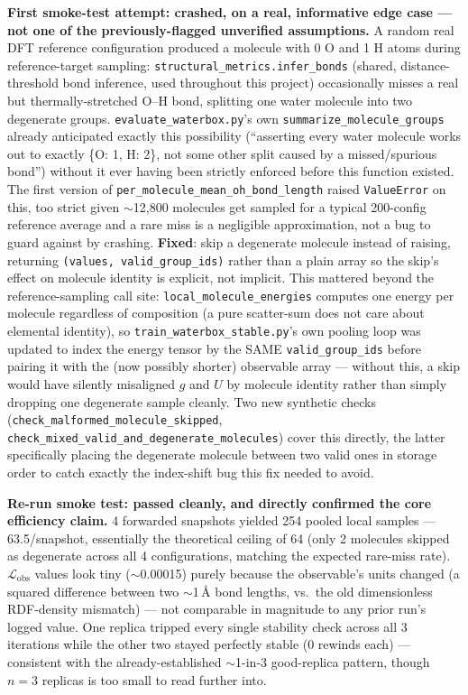 \documentclass[11pt]{article}
\begin{document}
\textbf{First smoke-test attempt: crashed, on a real, informative edge case
--- not one of the previously-flagged unverified assumptions.} A random
real DFT reference configuration produced a molecule with 0 O and 1 H atoms
during reference-target sampling: \texttt{structural\_metrics.infer\_bonds}
(shared, distance-threshold bond inference, used throughout this project)
occasionally misses a real but thermally-stretched O--H bond, splitting one
water molecule into two degenerate groups.
\texttt{evaluate\_waterbox.py}'s own \texttt{summarize\_molecule\_groups}
already anticipated exactly this possibility (``asserting every water
molecule works out to exactly \{O: 1, H: 2\}, not some other split caused
by a missed/spurious bond'') without it ever having been strictly enforced
before this function existed. The first version of
\texttt{per\_molecule\_mean\_oh\_bond\_length} raised \texttt{ValueError}
on this, too strict given $\sim$12{,}800 molecules get sampled for a
typical 200-config reference average and a rare miss is a negligible
approximation, not a bug to guard against by crashing. \textbf{Fixed}: skip
a degenerate molecule instead of raising, returning
\texttt{(values, valid\_group\_ids)} rather than a plain array so the
skip's effect on molecule identity is explicit, not implicit. This
mattered beyond the reference-sampling call site:
\texttt{local\_molecule\_energies} computes one energy per molecule
regardless of composition (a pure scatter-sum does not care about
elemental identity), so \texttt{train\_waterbox\_stable.py}'s own pooling
loop was updated to index the energy tensor by the SAME
\texttt{valid\_group\_ids} before pairing it with the (now possibly
shorter) observable array --- without this, a skip would have silently
misaligned $g$ and $U$ by molecule identity rather than simply dropping one
degenerate sample cleanly. Two new synthetic checks
(\texttt{check\_malformed\_molecule\_skipped},
\texttt{check\_mixed\_valid\_and\_degenerate\_molecules}) cover this
directly, the latter specifically placing the degenerate molecule between
two valid ones in storage order to catch exactly the index-shift bug this
fix needed to avoid.

\textbf{Re-run smoke test: passed cleanly, and directly confirmed the core
efficiency claim.} 4 forwarded snapshots yielded 254 pooled local samples
--- 63.5/snapshot, essentially the theoretical ceiling of 64 (only 2
molecules skipped as degenerate across all 4 configurations, matching the
expected rare-miss rate). $\mathcal{L}_{\text{obs}}$ values look tiny
($\sim$0.00015) purely because the observable's units changed (a squared
difference between two $\sim$1\,\AA{} bond lengths, vs.\ the old
dimensionless RDF-density mismatch) --- not comparable in magnitude to any
prior run's logged value. One replica tripped every single stability check
across all 3 iterations while the other two stayed perfectly stable
(0 rewinds each) --- consistent with the already-established $\sim$1-in-3
good-replica pattern, though $n=3$ replicas is too small to read further
into.
\end{document}
